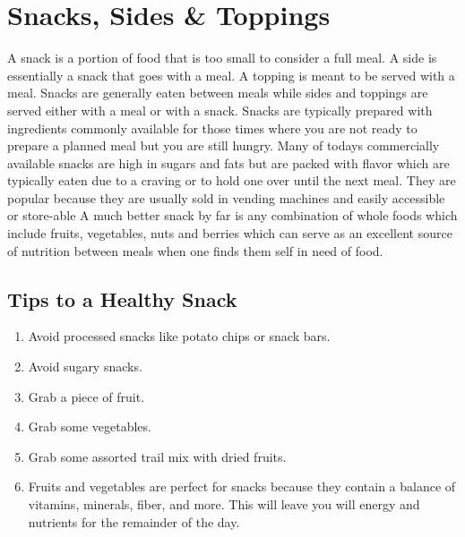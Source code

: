 \AddToShipoutPicture*{\FruitBowl}
\chapter{Snacks, Sides \& Toppings}

A snack is a portion of food that is too small to consider a full meal. A side is essentially a snack that goes with a meal. A topping is meant to be served with a meal. Snacks are generally eaten between meals while sides and toppings are served either with a meal or with a snack. Snacks are typically prepared with ingredients commonly available for those times where you are not ready to prepare a planned meal but you are still hungry. Many of todays commercially available snacks are high in sugars and fats but are packed with flavor which are typically eaten due to a craving or to hold one over until the next meal. They are popular because they are usually sold in vending machines and easily accessible or store-able A much better snack by far is any combination of whole foods which include fruits, vegetables, nuts and berries which can serve as an excellent source of nutrition between meals when one finds them self in need of food. 


\section*{Tips to a Healthy Snack}
\begin{enumerate}
	\item Avoid processed snacks like potato chips or snack bars.
	\item Avoid sugary snacks.
	\item Grab a piece of fruit.
	\item Grab some vegetables.
	\item Grab some assorted trail mix with dried fruits.
	\item Fruits and vegetables are perfect for snacks because they contain a balance of vitamins, minerals, fiber, and more. This will leave you will energy and nutrients for the remainder of the day.
\end{enumerate}